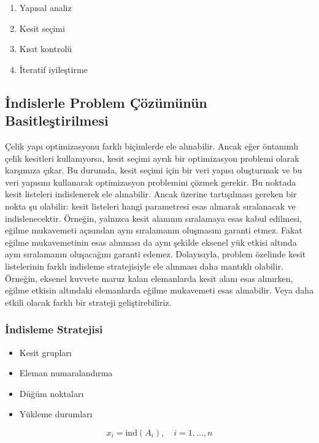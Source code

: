 \begin{tcolorbox}[title=Optimizasyon Süreci]
\begin{enumerate}
    \item Yapısal analiz
    \item Kesit seçimi
    \item Kısıt kontrolü
    \item İteratif iyileştirme
\end{enumerate}
\end{tcolorbox}



\subsection{İndislerle Problem Çözümünün Basitleştirilmesi}
Çelik yapı optimizasyonu farklı biçimlerde ele alınabilir. Ancak eğer öntanımlı çelik kesitleri kullanıyorsa, kesit seçimi ayrık bir optimizasyon problemi olarak karşımıza çıkar. Bu durumda, kesit seçimi için bir veri yapısı oluşturmak ve bu veri yapısını kullanarak optimizasyon problemini çözmek gerekir. Bu noktada kesit listeleri indislenerek ele alınabilir. Ancak üzerine tartışılması gereken bir nokta şu olabilir: kesit listeleri hangi parametresi esas alınarak sıralanacak ve indislenecektir. Örneğin, yalnızca kesit alanının sıralamaya esas kabul edilmesi, eğilme mukavemeti açısından aynı sıralamanın oluşmasını garanti etmez. Fakat eğilme mukavemetinin esas alınması da aynı şekilde eksenel yük etkisi altında aynı sıralamanın oluşacağını garanti edemez. Dolayısıyla, problem özelinde kesit listelerinin farklı indisleme stratejisiyle ele alınması daha mantıklı olabilir. Örneğin, eksenel kuvvete maruz kalan elemanlarda kesit alanı esas alınırken, eğilme etkisin altındaki elemanlarda eğilme mukavemeti esas alınabilir. Veya daha etkili olacak farklı bir strateji geliştirebiliriz. 

\subsubsection{İndisleme Stratejisi}
\begin{itemize}
    \item Kesit grupları
    \item Eleman numaralandırma
    \item Düğüm noktaları
    \item Yükleme durumları
\end{itemize}

\begin{equation}
x_i = \text{ind}(A_i), \quad i = 1,\ldots,n
\end{equation}

